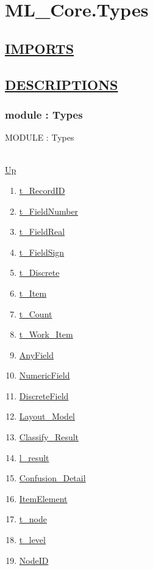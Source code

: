 \chapter*{ML\_Core.Types}
\hypertarget{ML_Core.Types}{}

\section*{\underline{IMPORTS}}

\section*{\underline{DESCRIPTIONS}}
\subsection*{module : Types}
\hypertarget{ecldoc:ML_Core.Types}{MODULE : Types} \\
\hyperlink{ecldoc:}{Up} \\
\par
\begin{enumerate}
\item \hyperlink{ecldoc:ml_core.types.t_recordid}{t\_RecordID}
\item \hyperlink{ecldoc:ml_core.types.t_fieldnumber}{t\_FieldNumber}
\item \hyperlink{ecldoc:ml_core.types.t_fieldreal}{t\_FieldReal}
\item \hyperlink{ecldoc:ml_core.types.t_fieldsign}{t\_FieldSign}
\item \hyperlink{ecldoc:ml_core.types.t_discrete}{t\_Discrete}
\item \hyperlink{ecldoc:ml_core.types.t_item}{t\_Item}
\item \hyperlink{ecldoc:ml_core.types.t_count}{t\_Count}
\item \hyperlink{ecldoc:ml_core.types.t_work_item}{t\_Work\_Item}
\item \hyperlink{ecldoc:ml_core.types.anyfield}{AnyField}
\item \hyperlink{ecldoc:ml_core.types.numericfield}{NumericField}
\item \hyperlink{ecldoc:ml_core.types.discretefield}{DiscreteField}
\item \hyperlink{ecldoc:ml_core.types.layout_model}{Layout\_Model}
\item \hyperlink{ecldoc:ml_core.types.classify_result}{Classify\_Result}
\item \hyperlink{ecldoc:ml_core.types.l_result}{l\_result}
\item \hyperlink{ecldoc:ml_core.types.confusion_detail}{Confusion\_Detail}
\item \hyperlink{ecldoc:ml_core.types.itemelement}{ItemElement}
\item \hyperlink{ecldoc:ml_core.types.t_node}{t\_node}
\item \hyperlink{ecldoc:ml_core.types.t_level}{t\_level}
\item \hyperlink{ecldoc:ml_core.types.nodeid}{NodeID}
\end{enumerate}
